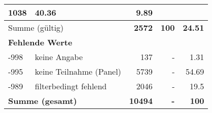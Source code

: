 \begin{longtable}{lXrrr}
       \num{1038} &
       \num[round-mode=places,round-precision=2]{40.36} &
         \num[round-mode=places,round-precision=2]{9.89} \\
     \midrule
     \multicolumn{2}{l}{Summe (gültig)} &
       \textbf{\num{2572}} &
     \textbf{\num{100}} &
       \textbf{\num[round-mode=places,round-precision=2]{24.51}} \\
     \multicolumn{5}{l}{\textbf{Fehlende Werte}}\\
       -998 &
       keine Angabe &
         \num{137} &
        - &
         \num[round-mode=places,round-precision=2]{1.31} \\
       -995 &
       keine Teilnahme (Panel) &
         \num{5739} &
        - &
         \num[round-mode=places,round-precision=2]{54.69} \\
       -989 &
       filterbedingt fehlend &
         \num{2046} &
        - &
         \num[round-mode=places,round-precision=2]{19.5} \\
     \midrule
     \multicolumn{2}{l}{\textbf{Summe (gesamt)}} &
          \textbf{\num{10494}} &
        \textbf{-} &
        \textbf{\num{100}} \\
     \bottomrule
     \end{longtable}
     

